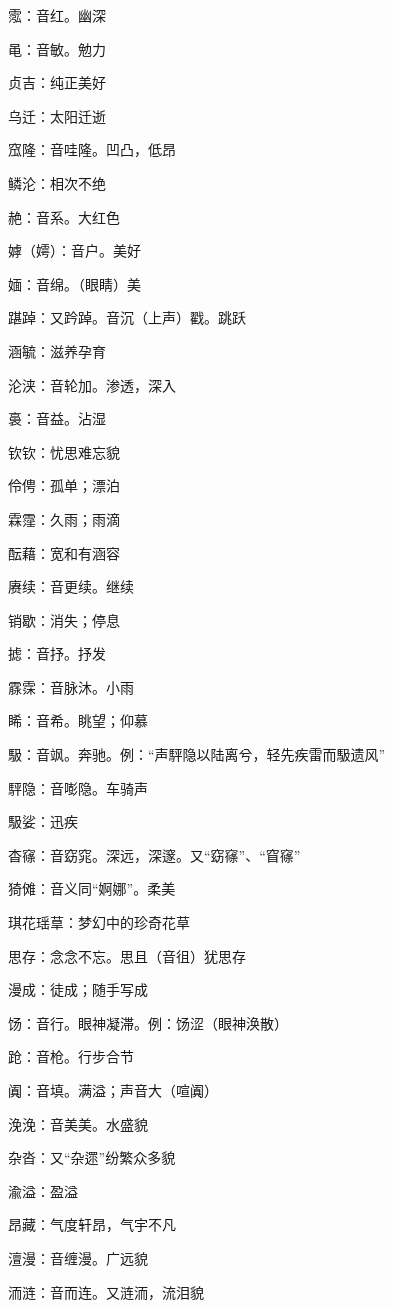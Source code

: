 霐：音红。幽深

黾：音敏。勉力

贞吉：纯正美好

乌迁：太阳迁逝

窊隆：音哇隆。凹凸，低昂

鳞沦：相次不绝

赩：音系。大红色

嫭（嫮）：音户。美好

媔：音绵。（眼睛）美

踸踔：又趻踔。音沉（上声）戳。跳跃

涵毓：滋养孕育

沦浃：音轮加。渗透，深入

裛：音益。沾湿

钦钦：忧思难忘貌

伶俜：孤单；漂泊

霖霪：久雨；雨滴

酝藉：宽和有涵容

赓续：音更续。继续

销歇：消失；停息

摅：音抒。抒发

霡霂：音脉沐。小雨

睎：音希。眺望；仰慕

馺：音飒。奔驰。例：“声駍隐以陆离兮，轻先疾雷而馺遗风”

駍隐：音嘭隐。车骑声

馺娑：迅疾

杳窱：音窈窕。深远，深邃。又“窈窱”、“窅窱”

猗傩：音义同“婀娜”。柔美

琪花瑶䓍：梦幻中的珍奇花草

思存：念念不忘。思且（音徂）犹思存

漫成：徒成；随手写成

饧：音行。眼神凝滞。例：饧涩（眼神涣散）

跄：音枪。行步合节

阗：音填。满溢；声音大（喧阗）

浼浼：音美美。水盛貌

杂沓：又“杂遝”纷繁众多貌

渝溢：盈溢

昂藏：气度轩昂，气宇不凡

澶漫：音缠漫。广远貌

洏涟：音而连。又涟洏，流泪貌

\newpage